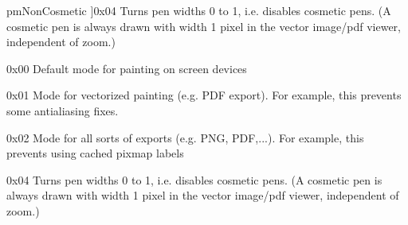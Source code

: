 \begin{Desc}
\begin{description}
{pm\+Non\+Cosmetic\hypertarget{class_q_c_p_painter_a156cf16444ff5e0d81a73c615fdb156dab1f50f65b248c5222d1d826cc01c837a}{}\label{class_q_c_p_painter_a156cf16444ff5e0d81a73c615fdb156dab1f50f65b248c5222d1d826cc01c837a}
}]{\ttfamily 0x04} Turns pen widths 0 to 1, i.\+e. disables cosmetic pens. (A cosmetic pen is always drawn with width 1 pixel in the vector image/pdf viewer, independent of zoom.) \item[{\em 
pm\+Default\hypertarget{class_q_c_p_painter_a156cf16444ff5e0d81a73c615fdb156daf70f0b3a3322c7edb6273a817ef9efcd}{}\label{class_q_c_p_painter_a156cf16444ff5e0d81a73c615fdb156daf70f0b3a3322c7edb6273a817ef9efcd}
}]{\ttfamily 0x00} Default mode for painting on screen devices \item[{\em 
pm\+Vectorized\hypertarget{class_q_c_p_painter_a156cf16444ff5e0d81a73c615fdb156daa4e636d20dd73397079efd4900abe5dd}{}\label{class_q_c_p_painter_a156cf16444ff5e0d81a73c615fdb156daa4e636d20dd73397079efd4900abe5dd}
}]{\ttfamily 0x01} Mode for vectorized painting (e.\+g. P\+DF export). For example, this prevents some antialiasing fixes. \item[{\em 
pm\+No\+Caching\hypertarget{class_q_c_p_painter_a156cf16444ff5e0d81a73c615fdb156da8ce8e67295145ede7599425bdfaaceff}{}\label{class_q_c_p_painter_a156cf16444ff5e0d81a73c615fdb156da8ce8e67295145ede7599425bdfaaceff}
}]{\ttfamily 0x02} Mode for all sorts of exports (e.\+g. P\+NG, P\+DF,...). For example, this prevents using cached pixmap labels \item[{\em 
pm\+Non\+Cosmetic\hypertarget{class_q_c_p_painter_a156cf16444ff5e0d81a73c615fdb156dab1f50f65b248c5222d1d826cc01c837a}{}\label{class_q_c_p_painter_a156cf16444ff5e0d81a73c615fdb156dab1f50f65b248c5222d1d826cc01c837a}
}]{\ttfamily 0x04} Turns pen widths 0 to 1, i.\+e. disables cosmetic pens. (A cosmetic pen is always drawn with width 1 pixel in the vector image/pdf viewer, independent of zoom.) \end{description}
\end{Desc}


